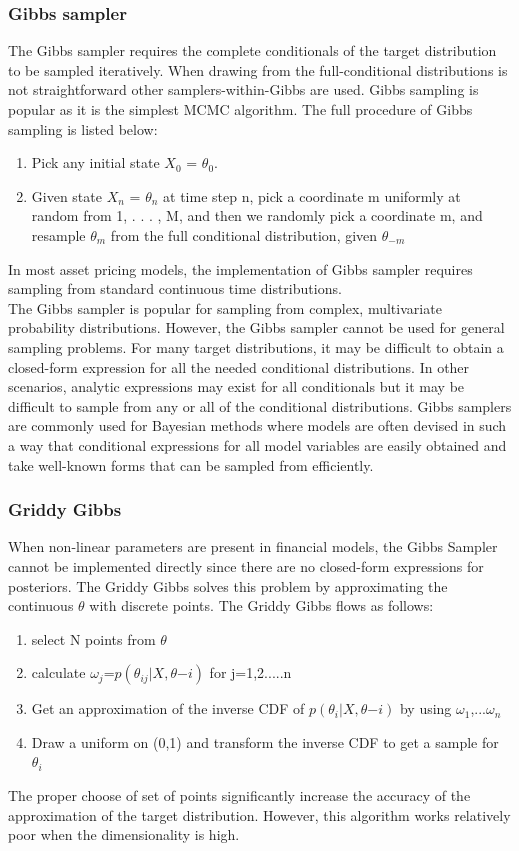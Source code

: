 \documentclass[letterpaper]{article}
\begin{document}
\subsubsection{Gibbs sampler}
The Gibbs sampler requires the complete conditionals of the target distribution to be sampled iteratively. When drawing from the full-conditional distributions is not straightforward other samplers-within-Gibbs are used. Gibbs sampling is popular as it is the simplest MCMC algorithm.
The full procedure of Gibbs sampling is listed below:
\begin{enumerate}
\item Pick any initial state $X_{0}$ = $\theta_{0}$.
\item Given state $X_{n}$ = $\theta_{n}$ at time step n, pick a coordinate m uniformly at random from {1, . . . , M}, and then we randomly pick a coordinate m, and resample $\theta_{m}$ from the full conditional distribution, given $\theta_{-m}$
\end{enumerate}
In most asset pricing models, the implementation of Gibbs sampler requires sampling from standard continuous time distributions.\\

The Gibbs sampler is popular for sampling from complex, multivariate probability distributions. However, the Gibbs sampler cannot be used for general sampling problems. For many target distributions, it may be difficult to obtain a closed-form expression for all the needed conditional distributions. In other scenarios, analytic expressions may exist for all conditionals but it may be difficult to sample from any or all of the conditional distributions. Gibbs samplers are commonly used for Bayesian methods where models are often devised in such a way that conditional expressions for all model variables are easily obtained and take well-known forms that can be sampled from efficiently.

\subsubsection{Griddy Gibbs}
When non-linear parameters are present in financial models, the Gibbs Sampler cannot be implemented directly since there are no closed-form expressions for posteriors. The Griddy Gibbs solves this problem by approximating the continuous $\theta$ with discrete points. The Griddy Gibbs flows as follows:
\begin{enumerate}
\item select N points from $\theta$
\item calculate $\omega_{j}$=$p(\theta_{ij}|X,\theta{-i})$ for j=1,2.....n
\item Get an approximation of the inverse CDF of $p(\theta_{i}|X,\theta{-i})$ by using $\omega_{1}$,...$\omega_{n}$
\item Draw a uniform on (0,1) and transform the inverse CDF to get a sample for $\theta_{i}$
\end{enumerate}
The proper choose of set of points significantly increase the accuracy of the approximation of the target distribution. However, this algorithm works relatively poor when the dimensionality is high. 
\end{document}
